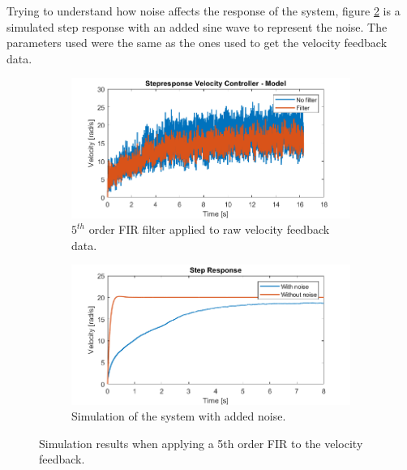 \documentclass[../../main.tex]{subfiles}
\begin{document}

Trying to understand how noise affects the response of the system, figure  \ref{fig:StepResponsAddedNoise} is a simulated step response with an added sine wave to represent the noise. The parameters used were the same as the ones used to get the velocity feedback data. 

\begin{figure}[H]
     \centering
     \begin{subfigure}[b]{0.49\textwidth}
         \centering
    \includegraphics[width=\textwidth]{Sections/Miscellaneous/Images/FilteredStepRespons5Order.png}
    \caption{$5^{th}$ order FIR filter applied to raw velocity feedback data.}
    \label{fig:FilteredStepRespons5Order}
     \end{subfigure}
     \hfill
     \begin{subfigure}[b]{0.49\textwidth}
         \centering
         \includegraphics[width=\textwidth]{Sections/Miscellaneous/Images/StepresponsAddedNoise.png}
         \caption{Simulation of the system with added noise.}
         \label{fig:StepResponsAddedNoise}
     \end{subfigure}
        \caption{Simulation results when applying a 5th order FIR to the velocity feedback.}
        \label{fig:FilterDiskussionImplementedFilter}
\end{figure}
\end{document}
